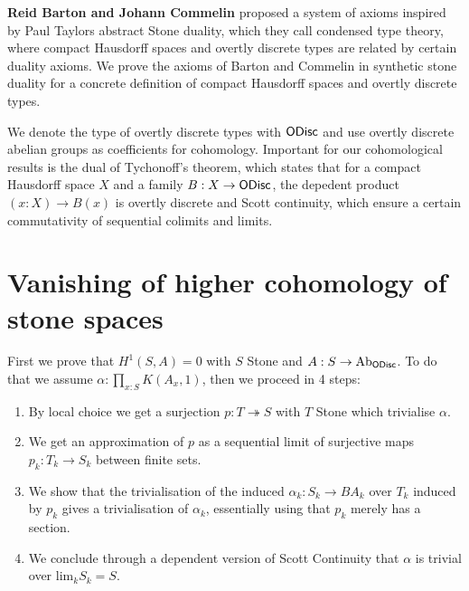 \documentclass{../util/zariski}
\begin{document}
\textbf{Reid Barton and Johann Commelin} proposed a system of axioms inspired by Paul Taylors abstract Stone duality, which they call condensed type theory, where compact Hausdorff spaces and overtly discrete types are related by certain duality axioms. We prove the axioms of Barton and Commelin in synthetic stone duality for a concrete definition of compact Hausdorff spaces and overtly discrete types.

We denote the type of overtly discrete types with $\mathsf{ODisc}$ and use overtly discrete abelian groups as coefficients for cohomology.
Important for our cohomological results is the dual of Tychonoff's theorem, which states that for a compact Hausdorff space $X$ and a family $B:X\to \mathsf{ODisc}$, the depedent product $(x:X)\to B(x)$ is overtly discrete and Scott continuity, which ensure a certain commutativity of sequential colimits and limits.

\section{Vanishing of higher cohomology of stone spaces}

First we prove that $H^1(S,A) = 0$ with $S$ Stone and  $A : S\to \mathrm{Ab}_{\mathsf{ODisc}}$. To do that we assume $\alpha:\prod_{x:S}K(A_x,1)$, then we proceed in 4 steps:
\begin{enumerate}[(1)]
\item By local choice we get a surjection $p:T\twoheadrightarrow S$ with $T$ Stone which trivialise $\alpha$.
\item We get an approximation of $p$ as a sequential limit of surjective maps $p_k:T_k\to S_k$ between finite sets.
\item We show that the trivialisation of the induced $\alpha_k:S_k\to BA_k$ over $T_k$ induced by $p_k$ gives a trivialisation of $\alpha_k$, essentially using that $p_k$ merely has a section.
\item We conclude through a dependent version of Scott Continuity that $\alpha$ is trivial over $\mathrm{lim}_kS_k =S$.
\end{enumerate}
\end{document}
